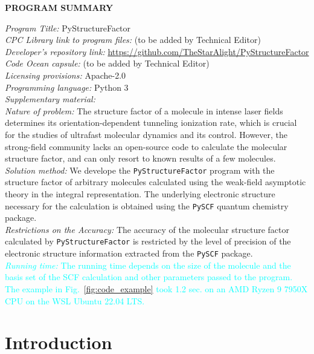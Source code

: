 \documentclass[preprint,12pt]{elsarticle} %
\newcommand{\cyan}[1]{\textcolor{cyan}{#1}}     %
\begin{document}
{\bf \noindent PROGRAM SUMMARY} \\
\begin{small}
\noindent
{\em Program Title:} PyStructureFactor \\
{\em CPC Library link to program files:} (to be added by Technical Editor) \\
{\em Developer's repository link:} \url{https://github.com/TheStarAlight/PyStructureFactor} \\
{\em Code Ocean capsule:} (to be added by Technical Editor) \\
{\em Licensing provisions:} Apache-2.0 \\
{\em Programming language:} Python 3                                  \\
{\em Supplementary material:}                                 \\
{\em Nature of problem:} The structure factor of a molecule in intense laser fields determines its orientation-dependent tunneling ionization rate, which is crucial for the studies of ultrafast molecular dynamics and its control. However, the strong-field community lacks an open-source code to calculate the molecular structure factor, and can only resort to known results of a few molecules. \\
{\em Solution method:} We develope the \texttt{PyStructureFactor} program with the structure factor of arbitrary molecules calculated using the weak-field asymptotic theory in the integral representation. The underlying electronic structure necessary for the calculation is obtained using the \texttt{PySCF} quantum chemistry package. \\
{\em Restrictions on the Accuracy:} The accuracy of the molecular structure factor calculated by \texttt{PyStructureFactor} is restricted by the level of precision of the electronic structure information extracted from the \texttt{PySCF} package. \\
\cyan{{\em Running time:} The running time depends on the size of the molecule and the basis set of the SCF calculation and other parameters passed to the program. The example in Fig.~\ref{fig:code_example} took 1.2 sec. on an AMD Ryzen 9 7950X CPU on the WSL Ubuntu 22.04 LTS.}
\end{small}


\section{Introduction}
\label{sec:intro}
\end{document}

